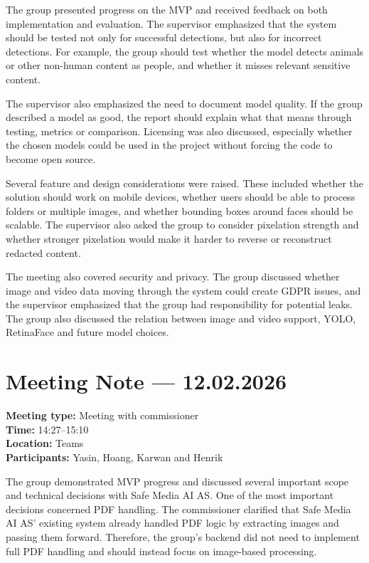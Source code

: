 The group presented progress on the MVP and received feedback on both implementation and evaluation. The supervisor emphasized that the system should be tested not only for successful detections, but also for incorrect detections. For example, the group should test whether the model detects animals or other non-human content as people, and whether it misses relevant sensitive content.

The supervisor also emphasized the need to document model quality. If the group described a model as good, the report should explain what that means through testing, metrics or comparison. Licensing was also discussed, especially whether the chosen models could be used in the project without forcing the code to become open source.

Several feature and design considerations were raised. These included whether the solution should work on mobile devices, whether users should be able to process folders or multiple images, and whether bounding boxes around faces should be scalable. The supervisor also asked the group to consider pixelation strength and whether stronger pixelation would make it harder to reverse or reconstruct redacted content.

The meeting also covered security and privacy. The group discussed whether image and video data moving through the system could create GDPR issues, and the supervisor emphasized that the group had responsibility for potential leaks. The group also discussed the relation between image and video support, YOLO, RetinaFace and future model choices.

\section{Meeting Note --- 12.02.2026}
\label{app:meeting-2026-02-12}
\textbf{Meeting type:} Meeting with commissioner\\
\textbf{Time:} 14:27--15:10\\
\textbf{Location:} Teams\\
\textbf{Participants:} Yasin, Hoang, Karwan and Henrik

The group demonstrated MVP progress and discussed several important scope and technical decisions with Safe Media AI AS. One of the most important decisions concerned PDF handling. The commissioner clarified that Safe Media AI AS' existing system already handled PDF logic by extracting images and passing them forward. Therefore, the group's backend did not need to implement full PDF handling and should instead focus on image-based processing.

